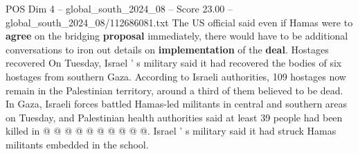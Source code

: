 \begin{textsample}{POS Dim 4 – global\_south\_2024\_08 – Score 23.00 – global\_south\_2024\_08/112686081.txt}
The US official said even if Hamas were to \textbf{agree} on the bridging \textbf{proposal} immediately, there would have to be additional conversations to iron out details on \textbf{implementation} of the \textbf{deal}.
Hostages recovered On Tuesday, Israel ' s military said it had recovered the bodies of six hostages from southern Gaza.
According to Israeli authorities, 109 hostages now remain in the Palestinian territory, around a third of them believed to be dead.
In Gaza, Israeli forces battled Hamas-led militants in central and southern areas on Tuesday, and Palestinian health authorities said at least 39 people had been killed in @ @ @ @ @ @ @ @ @ @.
Israel ' s military said it had struck Hamas militants embedded in the school.

\end{textsample}
